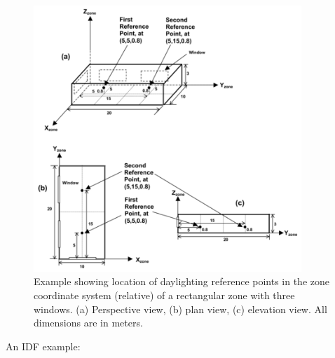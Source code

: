 \begin{figure}[hbtp] %
\centering
\includegraphics[width=0.9\textwidth, height=0.9\textheight, keepaspectratio=true]{media/image095.png}
\caption{Example showing location of daylighting reference points in the zone coordinate system (relative) of a rectangular zone with three windows. (a) Perspective view, (b) plan view, (c) elevation view. All dimensions are in meters. \protect \label{fig:example-showing-location-of-daylighting}}
\end{figure}




An IDF example:

